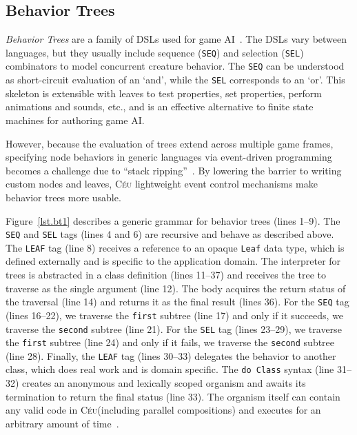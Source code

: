 \documentclass{sig-alternate}
\newcommand{\CEU}{\textsc{C\'{e}u}\xspace}
\newcommand{\code}[1] {{\small{\texttt{#1}}}}
\begin{document}
\subsection{Behavior Trees}
\label{subsec.bt}

\emph{Behavior Trees} are a family of DSLs used for game 
AI~\cite{isla2005,hecker2009my}.
The DSLs vary between languages, but they usually include sequence (\code{SEQ}) 
and selection (\code{SEL}) combinators to model concurrent creature behavior.
%
The \code{SEQ} can be understood as short-circuit evaluation of an `and',
while the \code{SEL} corresponds to an `or'.
%
This skeleton is extensible with leaves to test properties, set properties, 
perform animations and sounds, etc., and is an effective alternative to finite 
state machines for authoring game AI.

However, because the evaluation of trees extend across multiple game frames, 
specifying node behaviors in generic languages via event-driven programming 
becomes a challenge due to ``stack ripping''~\cite{krohn2007events}.
%
%
By lowering the barrier to writing custom nodes and leaves, \CEU lightweight 
event control mechanisms make behavior trees more usable.

Figure~\ref{lst.bt1} describes a generic grammar for behavior trees (lines 
1--9).
The \code{SEQ} and \code{SEL} tags (lines 4 and 6) are recursive and behave as 
described above.
The \code{LEAF} tag (line 8) receives a reference to an opaque \code{Leaf} data 
type, which is defined externally and is specific to the application domain.
%
The interpreter for trees is abstracted in a class definition (lines 11--37) 
and receives the tree to traverse as the single argument (line 12).
The body acquires the return status of the traversal (line 14) and returns it 
as the final result (lines 36).
%
%
For the \code{SEQ} tag (lines 16--22), we traverse the \code{first} subtree 
(line 17) and only if it succeeds, we traverse the \code{second} subtree (line 
21).
%
For the \code{SEL} tag (lines 23--29), we traverse the \code{first} subtree 
(line 24) and only if it fails, we traverse the \code{second} subtree (line 
28).
%
Finally, the \code{LEAF} tag (lines 30--33) delegates the behavior to another 
class, which does real work and is domain specific.
The \code{do Class} syntax (line 31--32) creates an anonymous and lexically 
scoped organism and awaits its termination to return the final status (line 
33).
The organism itself can contain any valid code in \CEU (including parallel 
compositions) and executes for an arbitrary amount of time~\cite{ceu.mod15}.
\end{document}
